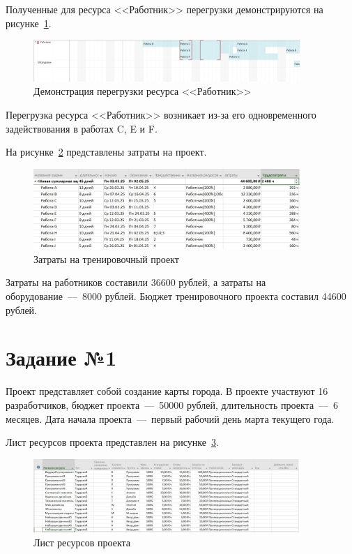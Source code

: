 Полученные для ресурса <<Работник>> перегрузки демонстрируются на рисунке~\ref{fig:test_overflow}.
	
\begin{figure}[H]
	\centering
	\includegraphics[width=0.9\textwidth]{img/test/overflow.jpg}
	\caption{Демонстрация перегрузки ресурса <<Работник>>}
	\label{fig:test_overflow}
\end{figure}

Перегрузка ресурса <<Работник>> возникает из-за его одновременного задействования в работах C, E и F.

На рисунке~\ref{fig:test_final} представлены затраты на проект.

\begin{figure}[H]
	\centering
	\includegraphics[width=0.9\textwidth]{img/test/final.jpg}
	\caption{Затраты на тренировочный проект}
	\label{fig:test_final}
\end{figure}

Затраты на работников составили 36600 рублей, а затраты на оборудование~---~8000 рублей.
Бюджет тренировочного проекта составил 44600 рублей.

\section{Задание №1}

Проект представляет собой создание карты города.
В проекте участвуют 16 разработчиков, бюджет проекта~---~50000 рублей, длительность проекта~---~6 месяцев.
Дата начала проекта~---~первый рабочий день марта текущего года.

Лист ресурсов проекта представлен на рисунке~\ref{fig:list}.

\begin{figure}[H]
	\centering
	\includegraphics[width=0.9\textwidth]{img/task1/list.jpg}
	\caption{Лист ресурсов проекта}
	\label{fig:list}
\end{figure}

